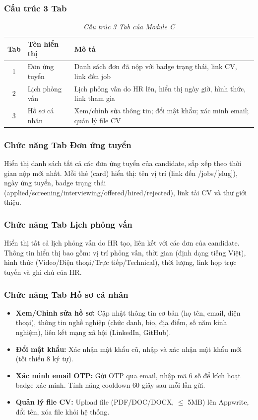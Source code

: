 \subsubsection*{Cấu trúc 3 Tab}
\begin{table}[H]
    \centering
    \renewcommand{\arraystretch}{1.3}
    \begin{tabular}{|c|l|p{9cm}|}
        \hline
        \textbf{Tab} & \textbf{Tên hiển thị} & \textbf{Mô tả} \\ \hline
        1 & Đơn ứng tuyển & Danh sách đơn đã nộp với badge trạng thái, link CV, link đến job \\ \hline
        2 & Lịch phỏng vấn & Lịch phỏng vấn do HR lên, hiển thị ngày giờ, hình thức, link tham gia \\ \hline
        3 & Hồ sơ cá nhân & Xem/chỉnh sửa thông tin; đổi mật khẩu; xác minh email; quản lý file CV \\ \hline
    \end{tabular}
    \caption{\textit{Cấu trúc 3 Tab của Module C}}
\end{table}

\subsubsection*{Chức năng Tab Đơn ứng tuyển}
Hiển thị danh sách tất cả các đơn ứng tuyển của candidate, sắp xếp theo thời gian nộp mới nhất. Mỗi thẻ (card) hiển thị: tên vị trí (link đến /jobs/[slug]), ngày ứng tuyển, badge trạng thái (applied/screening/interviewing/offered/hired/rejected), link tải CV và thư giới thiệu.

\subsubsection*{Chức năng Tab Lịch phỏng vấn}
Hiển thị tất cả lịch phỏng vấn do HR tạo, liên kết với các đơn của candidate. Thông tin hiển thị bao gồm: vị trí phỏng vấn, thời gian (định dạng tiếng Việt), hình thức (Video/Điện thoại/Trực tiếp/Technical), thời lượng, link họp trực tuyến và ghi chú của HR.

\subsubsection*{Chức năng Tab Hồ sơ cá nhân}
\begin{itemize}
    \item \textbf{Xem/Chỉnh sửa hồ sơ:} Cập nhật thông tin cơ bản (họ tên, email, điện thoại), thông tin nghề nghiệp (chức danh, bio, địa điểm, số năm kinh nghiệm), liên kết mạng xã hội (LinkedIn, GitHub).
    \item \textbf{Đổi mật khẩu:} Xác nhận mật khẩu cũ, nhập và xác nhận mật khẩu mới (tối thiểu 8 ký tự).
    \item \textbf{Xác minh email OTP:} Gửi OTP qua email, nhập mã 6 số để kích hoạt badge xác minh. Tính năng cooldown 60 giây sau mỗi lần gửi.
    \item \textbf{Quản lý file CV:} Upload file (PDF/DOC/DOCX, $\le$ 5MB) lên Appwrite, đổi tên, xóa file khỏi hệ thống.
\end{itemize}


